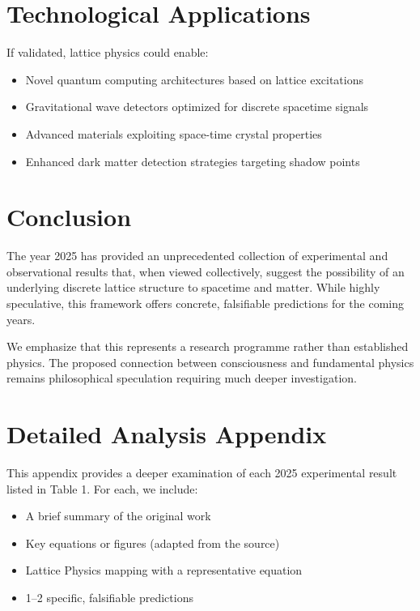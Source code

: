 \documentclass[11pt,a4paper]{article}
\begin{document}
\section{Technological Applications}

If validated, lattice physics could enable:
\begin{itemize}
    \item Novel quantum computing architectures based on lattice excitations
    \item Gravitational wave detectors optimized for discrete spacetime signals  
    \item Advanced materials exploiting space-time crystal properties
    \item Enhanced dark matter detection strategies targeting shadow points
\end{itemize}

\section{Conclusion}

The year 2025 has provided an unprecedented collection of experimental and observational results that, when viewed collectively, suggest the possibility of an underlying discrete lattice structure to spacetime and matter. While highly speculative, this framework offers concrete, falsifiable predictions for the coming years.

We emphasize that this represents a research programme rather than established physics. The proposed connection between consciousness and fundamental physics remains philosophical speculation requiring much deeper investigation.

\section{Detailed Analysis Appendix}

This appendix provides a deeper examination of each 2025 experimental result listed in Table 1. For each, we include:
\begin{itemize}
\item A brief summary of the original work
\item Key equations or figures (adapted from the source)
\item Lattice Physics mapping with a representative equation
\item 1--2 specific, falsifiable predictions
\end{itemize}
\end{document}
